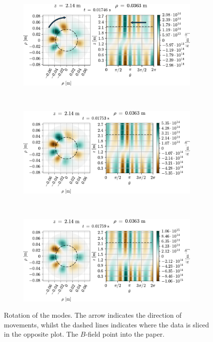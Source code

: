 %
{
\clearpage
\thispagestyle{empty}
\begin{figure}[htbp]
    \vspace*{-1cm}
    \centering
    \begin{subfigure}[h]{1.00\textwidth}
        \centering
        \includegraphics{fig/results/rotModes/n-perpPol-2D-fluct-0_rot}
        \label{fig:rot1}
    \end{subfigure}%
    \\
    \begin{subfigure}[h]{1.00\textwidth}
        \centering
        \includegraphics{fig/results/rotModes/n-perpPol-2D-fluct-1}
        \label{fig:rot2}
    \end{subfigure}
    \\
    \begin{subfigure}[h]{1.00\textwidth}
        \centering
        \includegraphics{fig/results/rotModes/n-perpPol-2D-fluct-2}
        \label{fig:rot3}
    \end{subfigure}
    \caption{Rotation of the modes.
        The arrow indicates the direction of movements, whilst the dashed lines indicates where the data is sliced in the opposite plot.
        The $B$-field point into the paper.
    }
    \label{fig:modeRotation}
\end{figure}
\clearpage
}
%

